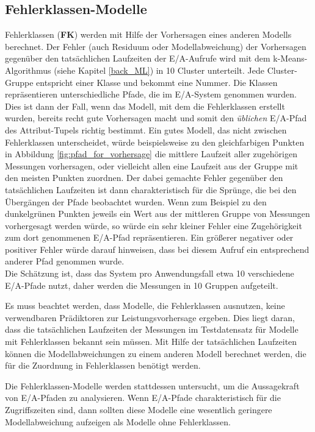 \documentclass[
	12pt,
	a4paper,
	BCOR10mm,
	DIV14,
	listof=totoc,
	bibliography=totoc,
	headsepline
]{scrreprt}
\begin{document}
\subsection{Fehlerklassen-Modelle}
\label{fk-modelle}
Fehlerklassen (\textbf{FK}) werden mit Hilfe der Vorhersagen eines anderen Modells berechnet. Der Fehler (auch Residuum oder Modellabweichung) der Vorhersagen gegenüber den tatsächlichen Laufzeiten der E/A-Aufrufe wird mit dem k-Means-Algorithmus (siehe Kapitel \ref{back_ML}) in 10 Cluster unterteilt.
Jede Cluster-Gruppe entspricht einer Klasse und bekommt eine Nummer. 
Die Klassen repräsentieren unterschiedliche Pfade, die im E/A-System genommen wurden. Dies ist dann der Fall, wenn das Modell, mit dem die Fehlerklassen erstellt wurden, bereits recht gute Vorhersagen macht und somit den \textit{üblichen} E/A-Pfad des Attribut-Tupels richtig bestimmt. 
Ein gutes Modell, das nicht zwischen Fehlerklassen unterscheidet, würde beispielsweise zu den gleichfarbigen Punkten in Abbildung \ref{fig:pfad_for_vorhersage} die mittlere Laufzeit aller zugehörigen Messungen vorhersagen, oder vielleicht allen eine Laufzeit aus der Gruppe mit den meisten Punkten zuordnen. 
Der dabei gemachte Fehler gegenüber den tatsächlichen Laufzeiten ist dann charakteristisch für die Sprünge, die bei den Übergängen der Pfade beobachtet wurden.
Wenn zum Beispiel zu den dunkelgrünen Punkten jeweils ein Wert aus der mittleren Gruppe von Messungen vorhergesagt werden würde, so würde ein sehr kleiner Fehler eine Zugehörigkeit zum dort genommenen E/A-Pfad repräsentieren.
Ein größerer negativer oder positiver Fehler würde darauf hinweisen, dass bei diesem Aufruf ein entsprechend anderer Pfad genommen wurde.\\
Die Schätzung ist, dass das System pro Anwendungsfall etwa 10 verschiedene E/A-Pfade nutzt, daher werden die Messungen in 10 Gruppen aufgeteilt.\medskip

Es muss beachtet werden, dass Modelle, die Fehlerklassen ausnutzen, keine verwendbaren Prädiktoren zur Leistungsvorhersage ergeben.
Dies liegt daran, dass die tatsächlichen Laufzeiten der Messungen im Testdatensatz für Modelle mit Fehlerklassen bekannt sein müssen. 
Mit Hilfe der tatsächlichen Laufzeiten können die Modellabweichungen zu einem anderen Modell berechnet werden, die für die Zuordnung in Fehlerklassen benötigt werden.\medskip

Die Fehlerklassen-Modelle werden stattdessen untersucht, um die Aussagekraft von E/A-Pfaden zu analysieren.
Wenn E/A-Pfade charakteristisch für die Zugriffszeiten sind, dann sollten diese Modelle eine wesentlich geringere Modellabweichung aufzeigen als Modelle ohne Fehlerklassen.
\end{document}
